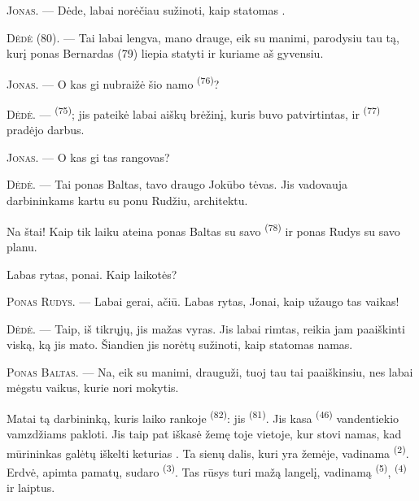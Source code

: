 \VUsaut{6.0mm}
\VUsaut{1.4mm}
\VUsaut{2.2mm}

\VUsaut{3.0mm}

\textsc{Jonas}. --- Dėde, labai norėčiau sužinoti, kaip statomas .

\textsc{Dėdė} (80). --- Tai labai lengva, mano drauge, eik su manimi, parodysiu tau
tą, kurį ponas Bernardas (79) liepia statyti ir kuriame aš gyvensiu.

\textsc{Jonas}. --- O kas gi nubraižė šio namo  \textsuperscript{(76)}?

\textsc{Dėdė}. ---  \textsuperscript{(75)}; jis pateikė labai
aiškų brėžinį, kuris buvo patvirtintas, ir 
\textsuperscript{(77)} pradėjo darbus.

\textsc{Jonas}. --- O kas gi tas rangovas?

\textsc{Dėdė}. --- Tai ponas Baltas, tavo draugo Jokūbo tėvas. Jis vadovauja
darbininkams kartu su ponu Rudžiu, architektu.

Na štai! Kaip tik laiku ateina ponas Baltas su savo 
\textsuperscript{(78)} ir ponas Rudys su savo planu.

Labas rytas, ponai. Kaip laikotės?

\textsc{Ponas Rudys}. --- Labai gerai, ačiū. Labas rytas, Jonai, kaip užaugo tas
vaikas!

\textsc{Dėdė}. --- Taip, iš tikrųjų, jis mažas vyras. Jis labai rimtas, reikia jam
paaiškinti viską, ką jis mato. Šiandien jis norėtų sužinoti, kaip statomas namas.

\VUsaut{3.0mm}

\textsc{Ponas Baltas}. --- Na, eik su manimi, drauguži, tuoj tau tai paaiškinsiu,
nes labai mėgstu vaikus, kurie nori mokytis.

Matai tą darbininką, kuris laiko rankoje  \textsuperscript{(82)}: jis
 \textsuperscript{(81)}. Jis kasa 
\textsuperscript{(46)} vandentiekio vamzdžiams pakloti. Jis taip pat iškasė žemę toje
vietoje, kur stovi namas, kad mūrininkas galėtų iškelti keturias .
Ta sienų dalis, kuri yra žemėje, vadinama  \textsuperscript{(2)}.
Erdvė, apimta pamatų, sudaro  \textsuperscript{(3)}. Tas rūsys turi mažą
langelį, vadinamą  \textsuperscript{(5)}, 
\textsuperscript{(4)} ir laiptus.

